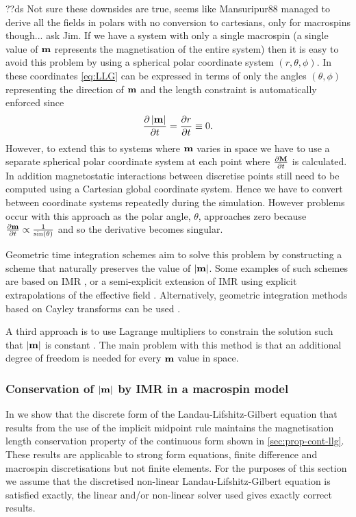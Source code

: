 ??ds Not sure these downsides are true, seems like Mansuripur88 managed to derive all the fields in polars with no conversion to cartesians, only for macrospins though... ask Jim.
If we have a system with only a single macrospin (\ie a single value of $\mathbf{m}$ represents the magnetisation of the entire system) then it is easy to avoid this problem by using a spherical polar coordinate system $(r,\theta,\phi)$.
In these coordinates \cref{eq:LLG} can be expressed in terms of only the angles $(\theta,\phi)$ representing the direction of $\mathbf{m}$ and the length constraint is automatically enforced since
\begin{equation}
  \label{eq:40}
  \frac{\partial \left|{\mathbf{m}} \right|}{\partial t} = \frac{\partial r}{\partial t} \equiv 0.
\end{equation}
However, to extend this to systems where $\mathbf{m}$ varies in space we have to use a separate spherical polar coordinate system at each point where $\frac{\partial \mathbf{M}}{\partial t}$ is calculated.
In addition magnetostatic interactions between discretise points still need to be computed using a Cartesian global coordinate system.
Hence we have to convert between coordinate systems repeatedly during the simulation.
However problems occur with this approach as the polar angle, $\theta$, approaches zero because $\frac{\partial \mathbf{m}}{\partial t} \propto \frac{1}{\sin(\theta)}$ \cite{Fukushima2005} and so the derivative becomes singular.

Geometric time integration schemes aim to solve this problem by constructing a scheme that naturally preserves the value of $\left|{\mathbf{m}} \right|$.
Some examples of such schemes are based on IMR \cite{DAquino2005}, or a semi-explicit extension of IMR using explicit extrapolations of the effective field \cite{Spargo2003} \cite{Serpico2001}.
Alternatively, geometric integration methods based on Cayley transforms can be used \cite{Lewis2003} \cite{Bottauscio2011}.

A third approach is to use Lagrange multipliers to constrain the solution such that $\left|{\mathbf{m}} \right|$ is constant \cite{Szambolics2008a}.
The main problem with this method is that an additional degree of freedom is needed for every $\mathbf{m}$ value in space.

\subsubsection{Conservation of $\left|{\mathbf{m}} \right|$ by IMR in a macrospin model}
\label{sec:proof-magn-length-ode-imr-llg}

In  we show that the discrete form of the Landau-Lifshitz-Gilbert equation that results from the use of the implicit midpoint rule maintains the magnetisation length conservation property of the continuous form shown in \cref{sec:prop-cont-llg}.
These results are applicable to strong form equations, \ie finite difference and macrospin discretisations but not finite elements.
For the purposes of this section we assume that the discretised non-linear Landau-Lifshitz-Gilbert equation is satisfied exactly, \ie the linear and/or non-linear solver used gives exactly correct results.


